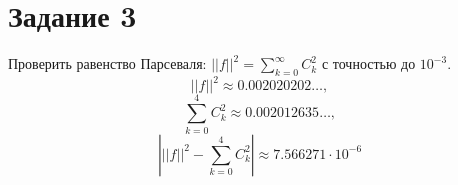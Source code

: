 \section*{Задание 3}
    Проверить равенство Парсеваля: \( ||f||^2 = \sum_{k=0}^{\infty} C_k^2 \) с точностью до \( 10^{-3} \).
    \[
        ||f||^2 \approx 0.002020202\dots,
    \]
    \[
        \sum_{k=0}^{4} C_k^2 \approx 0.002012635\dots,
    \]
    \[
        \left| ||f||^2 -  \sum_{k=0}^{4} C_k^2  \right| \approx 7.566271 \cdot 10^{-6}
    \]